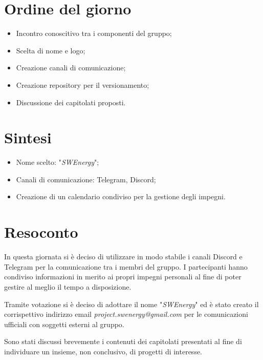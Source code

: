 \section{Ordine del giorno}
\begin{itemize}
    \item Incontro conoscitivo tra i componenti del gruppo;
    \item Scelta di nome e logo;
    \item Creazione canali di comunicazione;
    \item Creazione repository per il versionamento;
    \item Discussione dei capitolati proposti.
\end{itemize}

\section{Sintesi}
\begin{itemize}
    \item Nome scelto: "\textit{SWEnergy}";
    \item Canali di comunicazione: Telegram, Discord;
    \item Creazione di un calendario condiviso per la gestione degli impegni.
\end{itemize}

\section{Resoconto}
In questa giornata si è deciso di utilizzare in modo stabile i canali Discord e Telegram per la comunicazione tra i membri del gruppo.
I partecipanti hanno condiviso informazioni in merito ai propri impegni personali al fine di poter gestire al meglio il tempo a disposizione. 

Tramite votazione si è deciso di adottare il nome "\textit{SWEnergy}" ed è stato creato il corrispettivo indirizzo email \textit{project.swenergy@gmail.com} per le comunicazioni ufficiali con soggetti esterni al gruppo. 

Sono stati discussi brevemente i contenuti dei capitolati presentati al fine di individuare un insieme, non conclusivo, di progetti di interesse.